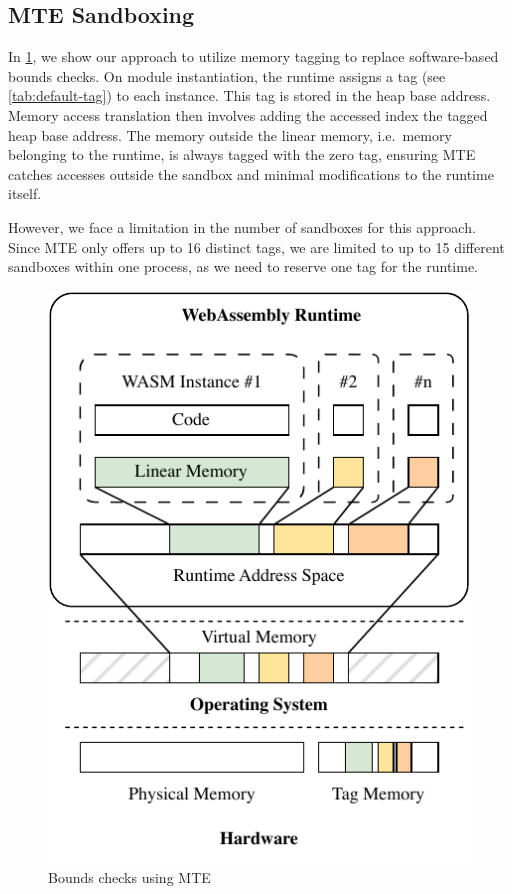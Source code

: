\subsection{\ac{MTE} Sandboxing}
\label{subsec:bounds-checks}

In \cref{fig:system-design-sandboxing}, we show our approach to utilize memory tagging to replace software-based bounds checks.
On module instantiation, the runtime assigns a tag (see \cref{tab:default-tag}) to each instance.
This tag is stored in the heap base address.
Memory access translation then involves adding the accessed index the tagged heap base address.
The memory outside the linear memory, i.e.\ memory belonging to the runtime, is always tagged with the zero tag, ensuring \ac{MTE} catches accesses outside the sandbox and minimal modifications to the runtime itself.

However, we face a limitation in the number of sandboxes for this approach.
Since \ac{MTE} only offers up to 16 distinct tags, we are limited to up to 15 different sandboxes within one process, as we need to reserve one tag for the runtime.

\begin{figure}[t]
  \centering
  \includegraphics[scale=1]{figures/build/system-design-1}
  \caption{Bounds checks using \ac{MTE}}
  \label{fig:system-design-sandboxing}
\end{figure}

